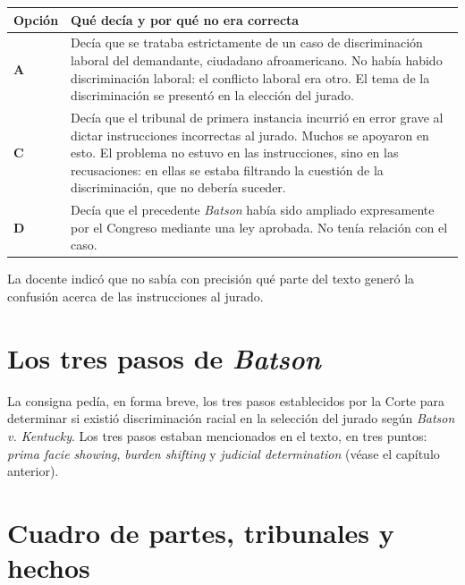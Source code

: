 \documentclass[12pt,oneside]{book}
\begin{document}
\begin{table}[H]
\centering
\renewcommand{\arraystretch}{1.3}
\begin{tabularx}{\textwidth}{
    >{\raggedright\arraybackslash}p{}
    >{\raggedright\arraybackslash}X
}
\toprule
\textbf{Opción} & \textbf{Qué decía y por qué no era correcta} \\
\midrule
\textbf{A} & Decía que se trataba estrictamente de un caso de discriminación laboral del demandante, ciudadano afroamericano. No había habido discriminación laboral: el conflicto laboral era otro. El tema de la discriminación se presentó en la elección del jurado. \\
\addlinespace
\textbf{C} & Decía que el tribunal de primera instancia incurrió en error grave al dictar instrucciones incorrectas al jurado. Muchos se apoyaron en esto. El problema no estuvo en las instrucciones, sino en las recusaciones: en ellas se estaba filtrando la cuestión de la discriminación, que no debería suceder. \\
\addlinespace
\textbf{D} & Decía que el precedente \textit{Batson} había sido ampliado expresamente por el Congreso mediante una ley aprobada. No tenía relación con el caso. \\
\bottomrule
\end{tabularx}
\end{table}


\begin{note}
La docente indicó que no sabía con precisión qué parte del texto generó la confusión acerca de las instrucciones al jurado.
\end{note}

\section{Los tres pasos de \textit{Batson}}

La consigna pedía, en forma breve, los tres pasos establecidos por la Corte para determinar si existió discriminación racial en la selección del jurado según \textit{Batson v. Kentucky}. Los tres pasos estaban mencionados en el texto, en tres puntos: \textit{prima facie showing}, \textit{burden shifting} y \textit{judicial determination} (véase el capítulo anterior).

\section{Cuadro de partes, tribunales y hechos}
\end{document}
